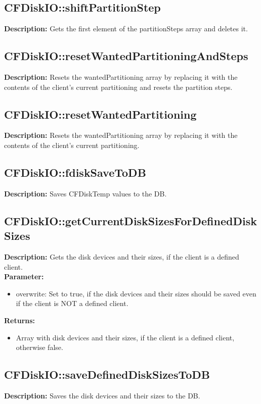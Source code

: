 \subsection{CFDiskIO::shiftPartitionStep}
\textbf{Description:} Gets the first element of the partitionSteps array and deletes it.\\

\subsection{CFDiskIO::resetWantedPartitioningAndSteps}
\textbf{Description:} Resets the wantedPartitioning array by replacing it with the contents of the client's current partitioning and resets the partition steps.\\

\subsection{CFDiskIO::resetWantedPartitioning}
\textbf{Description:} Resets the wantedPartitioning array by replacing it with the contents of the client's current partitioning.\\

\subsection{CFDiskIO::fdiskSaveToDB}
\textbf{Description:} Saves CFDiskTemp values to the DB.\\

\subsection{CFDiskIO::getCurrentDiskSizesForDefinedDiskSizes}
\textbf{Description:} Gets the disk devices and their sizes, if the client is a defined client.\\
\textbf{Parameter:}
\begin{itemize}
\item overwrite: Set to true, if the disk devices and their sizes should be saved even if the client is NOT a defined client.
\end{itemize}
\textbf{Returns:}
\begin{itemize}
\item Array with disk devices and their sizes, if the client is a defined client, otherwise false.
\end{itemize}

\subsection{CFDiskIO::saveDefinedDiskSizesToDB}
\textbf{Description:} Saves the disk devices and their sizes to the DB.\\

